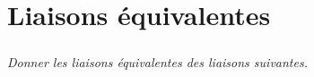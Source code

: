 \documentclass[10pt]{article}
\begin{document}






%
%

\section*{Liaisons équivalentes}
\subparagraph*{}\textit{Donner les liaisons équivalentes des liaisons suivantes.}%
\end{document}

